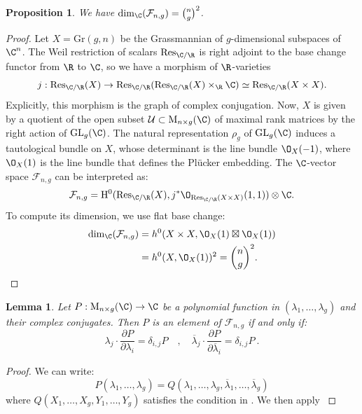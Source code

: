 \documentclass[11pt,letterpaper,english]{amsart}
\numberwithin{equation}{subsection}
\numberwithin{equation}{section}
\newcommand\cF{{\mathcal F}}
\newcommand{\GL}{\mathrm{GL}}
\newcommand{\Res}{\mathrm{Res}}
\theoremstyle{plain}
\newtheorem{proposition}[theorem]{Proposition}
\newtheorem{lemma}[theorem]{Lemma}
\theoremstyle{remark}
\begin{document}
\begin{proposition}
We have $\dim_\C(\cF_{n,g}) = \binom{n}{g}^2$.
\end{proposition}
\begin{proof}
    Let $X=\mathrm{Gr}(g,n)$ be the Grassmannian of $g$-dimensional subspaces of $\C^n$. The Weil restriction of scalars $\Res_{\C/\R}$ is right adjoint to the base change functor from $\R$ to $\C$, so we have a morphism of $\R$-varieties
    $$j:\Res_{\C/\R}(X) \to \Res_{\C/\R}(\Res_{\C/\R}(X)\times_\R \C)\simeq \Res_{\C/\R}(X\times X).$$
    Explicitly, this morphism is the graph of complex conjugation.
    Now, $X$ is given by a quotient of the open subset $\mathcal U\subset \mathrm{M}_{n\times g}(\C)$ of maximal rank matrices by the right action of $\GL_g(\C)$. The natural representation $\rho_g$ of $\GL_g(\C)$ induces a tautological bundle on $X$, whose determinant is the line bundle $\O_X(-1)$, where $\O_X(1)$ is the line bundle that defines the Pl\"{u}cker embedding. The $\C$-vector space $\cF_{n,g}$ can be interpreted as:
    $$\cF_{n,g} = \mathrm{H}^0(\Res_{\C/\R}(X),j^* \O_{\Res_{\C/\R}(X\times X)}(1,1))\otimes \C.$$
    To compute its dimension, we use flat base change:
    \begin{align*}
        \dim_\C(\cF_{n,g})
        &= h^0(X\times X, \O_X(1)\boxtimes \O_X(1))\\
        &= h^0(X,\O_X(1))^2 = \binom{n}{g}^2.
    \end{align*}
    
    
    
    
\end{proof}


\begin{lemma}\label{lemma:homogeneous}
    Let $P:\mathrm M_{n\times g}(\C)\rightarrow \C$ be a polynomial function in $(\lambda_1,\ldots,\lambda_g)$ and their complex conjugates. Then $P$ is an element of $\cF_{n,g}$ if and only if:
    \[\lambda_j\cdot\frac{\partial P}{\partial \lambda_i}=\delta_{i,j}P\quad , \quad \overline{\lambda}_j\cdot\frac{\partial P}{\partial \overline{\lambda}_i}=\delta_{i,j}P~.\]
\end{lemma}
\begin{proof}
    We can write:
    \[P(\lambda_1,\ldots,\lambda_g)=Q(\lambda_1,\ldots,\lambda_g,\overline{\lambda}_1,\ldots,\overline{\lambda}_g)\]
    where $Q(X_1,\ldots,X_g,Y_1,\ldots,Y_g)$ satisfies the condition in . We then apply \cite[Proposition 3.4]{roehrig}
\end{proof}
\end{document}
